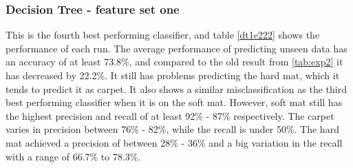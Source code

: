 \documentclass[USenglish]{ifimaster}  %
\begin{document}
	
	

\subsubsection{Decision Tree - feature set one}
This is the fourth best performing classifier, and table \ref{dt1e222} shows the performance of each run. The average performance of predicting unseen data has an accuracy of at least 73.8\%, and compared to the old result from \ref{tab:exp2} it has decreased by 22.2\%. It still has problems predicting the hard mat, which it tends to predict it as carpet. It also shows a similar misclassification as the third best performing classifier when it is on the soft mat. However, soft mat still has the highest precision and recall of at least 92\% - 87\% respectively. The carpet varies in precision between 76\% - 82\%, while the recall is under 50\%. The hard mat achieved a precision of between 28\% - 36\% and a big variation in the recall with a range of 66.7\% to 78.3\%.
\end{document}

